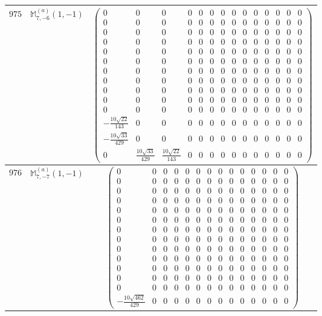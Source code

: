 \documentclass[fleqn,8pt,landscape]{jsarticle}
\begin{document}
\begin{center}
\begin{longtable}{ccc}
$ 975 $ & $ \mathbb{M}_{7,-6}^{(a)}(1,-1) $ & $ \begin{pmatrix} 0 & 0 & 0 & 0 & 0 & 0 & 0 & 0 & 0 & 0 & 0 & 0 & 0 & 0 \\ 0 & 0 & 0 & 0 & 0 & 0 & 0 & 0 & 0 & 0 & 0 & 0 & 0 & 0 \\ 0 & 0 & 0 & 0 & 0 & 0 & 0 & 0 & 0 & 0 & 0 & 0 & 0 & 0 \\ 0 & 0 & 0 & 0 & 0 & 0 & 0 & 0 & 0 & 0 & 0 & 0 & 0 & 0 \\ 0 & 0 & 0 & 0 & 0 & 0 & 0 & 0 & 0 & 0 & 0 & 0 & 0 & 0 \\ 0 & 0 & 0 & 0 & 0 & 0 & 0 & 0 & 0 & 0 & 0 & 0 & 0 & 0 \\ 0 & 0 & 0 & 0 & 0 & 0 & 0 & 0 & 0 & 0 & 0 & 0 & 0 & 0 \\ 0 & 0 & 0 & 0 & 0 & 0 & 0 & 0 & 0 & 0 & 0 & 0 & 0 & 0 \\ 0 & 0 & 0 & 0 & 0 & 0 & 0 & 0 & 0 & 0 & 0 & 0 & 0 & 0 \\ 0 & 0 & 0 & 0 & 0 & 0 & 0 & 0 & 0 & 0 & 0 & 0 & 0 & 0 \\ 0 & 0 & 0 & 0 & 0 & 0 & 0 & 0 & 0 & 0 & 0 & 0 & 0 & 0 \\ - \frac{10 \sqrt{22}}{143} & 0 & 0 & 0 & 0 & 0 & 0 & 0 & 0 & 0 & 0 & 0 & 0 & 0 \\ - \frac{10 \sqrt{33}}{429} & 0 & 0 & 0 & 0 & 0 & 0 & 0 & 0 & 0 & 0 & 0 & 0 & 0 \\ 0 & \frac{10 \sqrt{33}}{429} & \frac{10 \sqrt{22}}{143} & 0 & 0 & 0 & 0 & 0 & 0 & 0 & 0 & 0 & 0 & 0 \end{pmatrix} $ \\ \hline
$ 976 $ & $ \mathbb{M}_{7,-7}^{(a)}(1,-1) $ & $ \begin{pmatrix} 0 & 0 & 0 & 0 & 0 & 0 & 0 & 0 & 0 & 0 & 0 & 0 & 0 & 0 \\ 0 & 0 & 0 & 0 & 0 & 0 & 0 & 0 & 0 & 0 & 0 & 0 & 0 & 0 \\ 0 & 0 & 0 & 0 & 0 & 0 & 0 & 0 & 0 & 0 & 0 & 0 & 0 & 0 \\ 0 & 0 & 0 & 0 & 0 & 0 & 0 & 0 & 0 & 0 & 0 & 0 & 0 & 0 \\ 0 & 0 & 0 & 0 & 0 & 0 & 0 & 0 & 0 & 0 & 0 & 0 & 0 & 0 \\ 0 & 0 & 0 & 0 & 0 & 0 & 0 & 0 & 0 & 0 & 0 & 0 & 0 & 0 \\ 0 & 0 & 0 & 0 & 0 & 0 & 0 & 0 & 0 & 0 & 0 & 0 & 0 & 0 \\ 0 & 0 & 0 & 0 & 0 & 0 & 0 & 0 & 0 & 0 & 0 & 0 & 0 & 0 \\ 0 & 0 & 0 & 0 & 0 & 0 & 0 & 0 & 0 & 0 & 0 & 0 & 0 & 0 \\ 0 & 0 & 0 & 0 & 0 & 0 & 0 & 0 & 0 & 0 & 0 & 0 & 0 & 0 \\ 0 & 0 & 0 & 0 & 0 & 0 & 0 & 0 & 0 & 0 & 0 & 0 & 0 & 0 \\ 0 & 0 & 0 & 0 & 0 & 0 & 0 & 0 & 0 & 0 & 0 & 0 & 0 & 0 \\ 0 & 0 & 0 & 0 & 0 & 0 & 0 & 0 & 0 & 0 & 0 & 0 & 0 & 0 \\ - \frac{10 \sqrt{462}}{429} & 0 & 0 & 0 & 0 & 0 & 0 & 0 & 0 & 0 & 0 & 0 & 0 & 0 \end{pmatrix} $ \\ \hline

\end{longtable}
\end{center}
\end{document}
